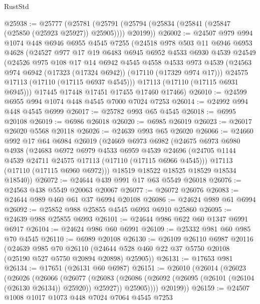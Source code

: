 \begin{lexlean}{RustStd}
\begin{coremodule}
@25938 := @25777
    (@25781 (@25791 (@25794 (@25834 (@25841 (@25847 (@25850 (@25923 @25927)) @25905)))) @20199))
@26002 := @24507
    @979
    @994
    @1074
    @448
    @6946
    @6955
    @4545
    @7255
    (@24518
      @978
      @503
      @11
      @6946
      @6953
      @4628
      (@24527
        @977
        @17
        @19
        @6483
        @6945
        @6952
        @4533
        @6930
        @4539
        @24549
        (@24526
          @975
          @108
          @17
          @14
          @6942
          @4545
          @4558
          @4533
          @973
          @4539
          (@24563 @974 @6942 (@17323 (@17324 @6942)) (@17110 (@17329 @974 @17)))
          @24575
          @17113
          (@17110 (@17115 @6937 @4545)))
        @17113
        (@17110 (@17115 @6931 @6945)))
      @17445
      @17448
      @17451
      @17455
      @17460
      @17466)
@26010 := @24599 @6955 @994 @1074 @448 @4545 @7000 @7024 @7253
@26014 := @24992 @994 @448 @4545 @6999
@26017 := @25782 @993 @65 @4545
@26018 := @6995 @20108
@26019 := @6986 @26018
@26020 := @6985 @26019
@26023 := @26017 @26020 @5568 @20118
@26026 := @24639 @993 @65 @26020
@26066 := @24660
    @992
    @17
    @64
    @6984
    @26019
    (@24669
      @6973
      @6982
      (@24675
        @6973
        @6980
        @4938
        (@24683
          @6972
          @6979
          @4533
          @6959
          @4539
          @24696
          (@24705 @1144 @4539 @24711 @24575 @17113 (@17110 (@17115 @6966 @4545)))
          @17113
          (@17110 (@17115 @6960 @6972)))
        @18519
        @18522
        @18525
        @18529
        @18534
        @18540))
@26072 := @24644 @439 @991 @17 @63 @5549 @26018
@26076 := @24563 @438 @5549 @20063 @20067
@26077 := @26072 @26076
@26083 := @24644 @989 @460 @61 @37 @6994 @20108
@26086 := @24624 @989 @61 @6994
@26092 := @25852 @988 @25855 @4545 @6993 @6910 @25860
@26095 := @24639 @988 @25855 @6993
@26101 := @24644 @986 @622 @60 @1347 @6991 @6917
@26104 := @24624 @986 @60 @6991
@26109 := @25332 @981 @60 @985 @70 @4545
@26110 := @6989 @20108
@26130 := @26109
    @26110
    @6987
    @20116
    (@24639
      @985
      @70
      @26110
      (@24644 @528 @460 @22 @37 @5750 @20108 (@25190 @527 @5750 @20894 @20898) @25905))
@26131 := @17653 @981
@26134 := @17651 (@26131 @60 @6987)
@26151 := @26010
    (@26014
      (@26023
        (@26026
          (@26066
            (@26077
              (@26083
                (@26086 (@26092 (@26095 (@26101 (@26104 (@26130 @26134)) @25920)) @25927))
                @25905))))
        @20199))
@26159 := @24507 @1008 @1017 @1073 @448 @7024 @7064 @4545 @7253

\end{coremodule}
\end{lexlean}
